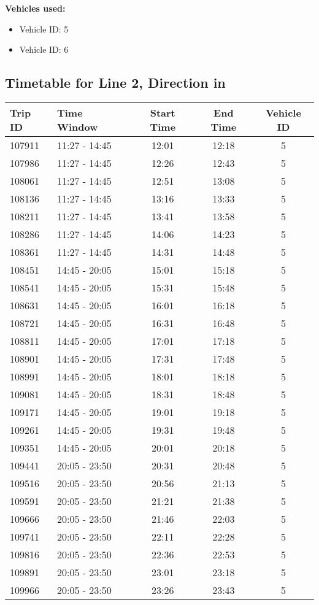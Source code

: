 \documentclass{article}
\begin{document}
\textbf{Vehicles used:}
\begin{itemize}
  \item Vehicle ID: 5
  \item Vehicle ID: 6
\end{itemize}

\subsection*{Timetable for Line 2, Direction in}
\begin{tabular}{llccc}
\toprule
Trip ID & Time Window & Start Time & End Time & Vehicle ID \\
\midrule
107911 & 11:27 - 14:45 & 12:01 & 12:18 & 5 \\
107986 & 11:27 - 14:45 & 12:26 & 12:43 & 5 \\
108061 & 11:27 - 14:45 & 12:51 & 13:08 & 5 \\
108136 & 11:27 - 14:45 & 13:16 & 13:33 & 5 \\
108211 & 11:27 - 14:45 & 13:41 & 13:58 & 5 \\
108286 & 11:27 - 14:45 & 14:06 & 14:23 & 5 \\
108361 & 11:27 - 14:45 & 14:31 & 14:48 & 5 \\
108451 & 14:45 - 20:05 & 15:01 & 15:18 & 5 \\
108541 & 14:45 - 20:05 & 15:31 & 15:48 & 5 \\
108631 & 14:45 - 20:05 & 16:01 & 16:18 & 5 \\
108721 & 14:45 - 20:05 & 16:31 & 16:48 & 5 \\
108811 & 14:45 - 20:05 & 17:01 & 17:18 & 5 \\
108901 & 14:45 - 20:05 & 17:31 & 17:48 & 5 \\
108991 & 14:45 - 20:05 & 18:01 & 18:18 & 5 \\
109081 & 14:45 - 20:05 & 18:31 & 18:48 & 5 \\
109171 & 14:45 - 20:05 & 19:01 & 19:18 & 5 \\
109261 & 14:45 - 20:05 & 19:31 & 19:48 & 5 \\
109351 & 14:45 - 20:05 & 20:01 & 20:18 & 5 \\
109441 & 20:05 - 23:50 & 20:31 & 20:48 & 5 \\
109516 & 20:05 - 23:50 & 20:56 & 21:13 & 5 \\
109591 & 20:05 - 23:50 & 21:21 & 21:38 & 5 \\
109666 & 20:05 - 23:50 & 21:46 & 22:03 & 5 \\
109741 & 20:05 - 23:50 & 22:11 & 22:28 & 5 \\
109816 & 20:05 - 23:50 & 22:36 & 22:53 & 5 \\
109891 & 20:05 - 23:50 & 23:01 & 23:18 & 5 \\
109966 & 20:05 - 23:50 & 23:26 & 23:43 & 5 \\
\bottomrule
\end{tabular}
\end{document}
